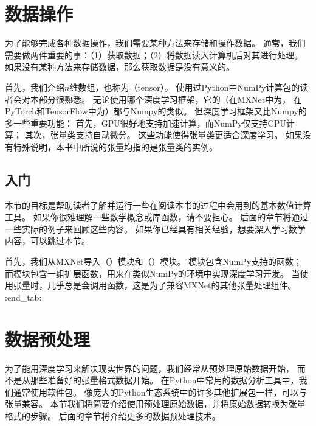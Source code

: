 \documentclass[letterpaper,10pt,english]{sphinxmanual}
\begin{document}
\sphinxstepscope


\section{数据操作}
\label{\detokenize{chapter_preliminaries/ndarray:sec-ndarray}}\label{\detokenize{chapter_preliminaries/ndarray:id1}}\label{\detokenize{chapter_preliminaries/ndarray::doc}}
\sphinxAtStartPar
为了能够完成各种数据操作，我们需要某种方法来存储和操作数据。
通常，我们需要做两件重要的事：（1）获取数据；（2）将数据读入计算机后对其进行处理。
如果没有某种方法来存储数据，那么获取数据是没有意义的。

\sphinxAtStartPar
首先，我们介绍\(n\)维数组，也称为（tensor）。
使用过Python中NumPy计算包的读者会对本部分很熟悉。
无论使用哪个深度学习框架，它的（在MXNet中为，
在PyTorch和TensorFlow中为）都与Numpy的类似。
但深度学习框架又比Numpy的多一些重要功能：
首先，GPU很好地支持加速计算，而NumPy仅支持CPU计算；
其次，张量类支持自动微分。 这些功能使得张量类更适合深度学习。
如果没有特殊说明，本书中所说的张量均指的是张量类的实例。


\subsection{入门}
\label{\detokenize{chapter_preliminaries/ndarray:id2}}
\sphinxAtStartPar
本节的目标是帮助读者了解并运行一些在阅读本书的过程中会用到的基本数值计算工具。
如果你很难理解一些数学概念或库函数，请不要担心。
后面的章节将通过一些实际的例子来回顾这些内容。
如果你已经具有相关经验，想要深入学习数学内容，可以跳过本节。

\sphinxAtStartPar
首先，我们从MXNet导入（）模块和（）模块。
模块包含NumPy支持的函数；
而模块包含一组扩展函数，用来在类似NumPy的环境中实现深度学习开发。
当使用张量时，几乎总是会调用函数，这是为了兼容MXNet的其他张量处理组件。
:end\_tab:

\sphinxstepscope


\section{数据预处理}
\label{\detokenize{chapter_preliminaries/pandas:sec-pandas}}\label{\detokenize{chapter_preliminaries/pandas:id1}}\label{\detokenize{chapter_preliminaries/pandas::doc}}
\sphinxAtStartPar
为了能用深度学习来解决现实世界的问题，我们经常从预处理原始数据开始，
而不是从那些准备好的张量格式数据开始。
在Python中常用的数据分析工具中，我们通常使用软件包。
像庞大的Python生态系统中的许多其他扩展包一样，可以与张量兼容。
本节我们将简要介绍使用预处理原始数据，并将原始数据转换为张量格式的步骤。
后面的章节将介绍更多的数据预处理技术。
\end{document}
